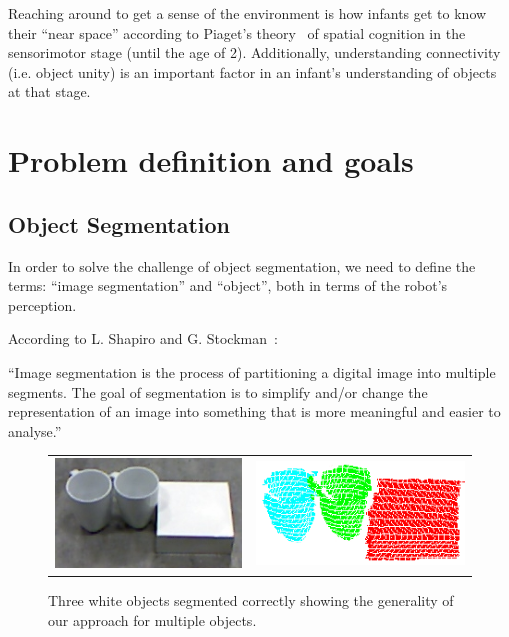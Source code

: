 Reaching around to get a sense of the environment is how infants get to know their
``near space'' according to Piaget's theory~\cite{infants} of spatial cognition in the sensorimotor stage 
(until the age of 2). Additionally, understanding connectivity (i.e. object unity) is an important factor in an infant's understanding of objects at that stage.











\section{Problem definition and goals}

\subsection{Object Segmentation} 

In order to solve the challenge of object segmentation, we need to define the terms: ``image segmentation'' and ``object'', both in terms of the robot's perception. 


According to L. Shapiro and G. Stockman~\cite{shapiro2001computer}:

\noindent ``Image segmentation is the process of partitioning a digital image into multiple segments. The goal of segmentation is to simplify and/or change the representation of an image into something that is more meaningful and easier to analyse.''

\begin{figure}[ht]
\begin{tabular}{cccc}

\multicolumn{2}{c}{\includegraphics[width=0.45\columnwidth]{figures/3objects/after_push.jpg}}
& \multicolumn{2}{c}{\includegraphics[width=0.45\columnwidth]{figures/3objects/segmented.png}}

\end{tabular}
\caption{Three white objects segmented correctly showing the generality of our approach for multiple objects.}
\label{fig:three_objects}
\end{figure}


